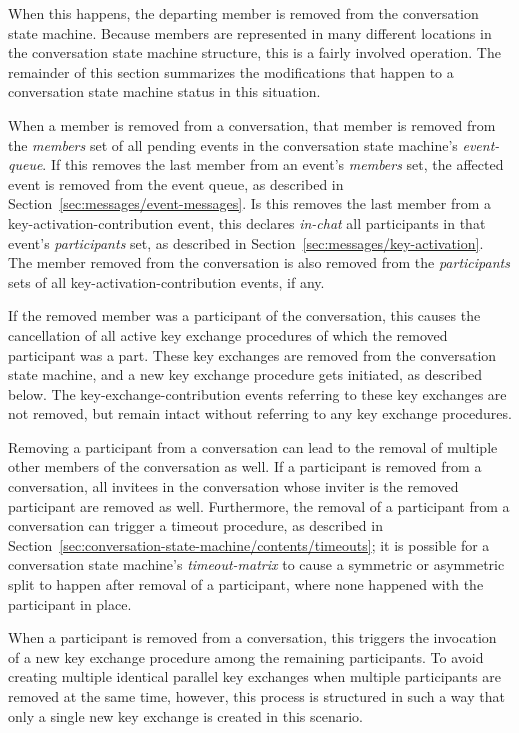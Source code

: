 \documentclass{article}
\def\smfield#1{\textsl{#1}}
\def\type#1{\textsf{#1}}
\begin{document}
When this happens, the departing member is removed from the conversation state machine.
Because members are represented in many different locations in the conversation state machine structure, this is a fairly involved operation.
The remainder of this section summarizes the modifications that happen to a conversation state machine status in this situation.

When a member is removed from a conversation, that member is removed from the \smfield{members} set of all pending events in the conversation state machine's \smfield{event-queue}.
If this removes the last member from an event's \smfield{members} set, the affected event is removed from the event queue, as described in Section~\ref{sec:messages/event-messages}.
Is this removes the last member from a \type{key-activation-contribution} event, this declares \smfield{in-chat} all participants in that event's \smfield{participants} set, as described in Section~\ref{sec:messages/key-activation}.
The member removed from the conversation is also removed from the \smfield{participants} sets of all \type{key-activation-contribution} events, if any.

If the removed member was a participant of the conversation, this causes the cancellation of all active key exchange procedures of which the removed participant was a part.
These key exchanges are removed from the conversation state machine, and a new key exchange procedure gets initiated, as described below.
The \type{key-exchange-contribution} events referring to these key exchanges are not removed, but remain intact without referring to any key exchange procedures.

Removing a participant from a conversation can lead to the removal of multiple other members of the conversation as well.
If a participant is removed from a conversation, all invitees in the conversation whose inviter is the removed participant are removed as well.
Furthermore, the removal of a participant from a conversation can trigger a timeout procedure, as described in Section~\ref{sec:conversation-state-machine/contents/timeouts}; it is possible for a conversation state machine's \smfield{timeout-matrix} to cause a symmetric or asymmetric split to happen after removal of a participant, where none happened with the participant in place.

When a participant is removed from a conversation, this triggers the invocation of a new key exchange procedure among the remaining participants.
To avoid creating multiple identical parallel key exchanges when multiple participants are removed at the same time, however, this process is structured in such a way that only a single new key exchange is created in this scenario.
\end{document}
